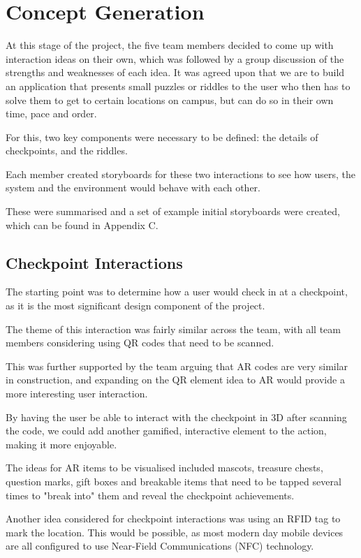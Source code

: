 \documentclass[10pt,twocolumn]{article} %
\begin{document}
\section*{Concept Generation}
At this stage of the project, the five team members decided to come up with interaction ideas on their own, which was followed by a group discussion of the strengths and weaknesses of each idea.
It was agreed upon that we are to build an application that presents small puzzles or riddles to the user who then has to solve them to get to certain locations on campus, but can do so in their own time, pace and order.

For this, two key components were necessary to be defined: the details of checkpoints, and the riddles.

Each member created storyboards for these two interactions to see how users, the system and the environment would behave with each other.

These were summarised and a set of example initial storyboards were created, which can be found in Appendix C.
\subsection*{Checkpoint Interactions}
The starting point was to determine how a user would check in at a checkpoint, as it is the most significant design component of the project. 

The theme of this interaction was fairly similar across the team, with all team members considering using QR codes that need to be scanned. 
 
This was further supported by the team arguing that AR codes are very similar in construction, and expanding on the QR element idea to AR would provide a more interesting user interaction. 

By having the user be able to interact with the checkpoint in 3D after scanning the code, we could add another gamified, interactive element to the action, making it more enjoyable. 

The ideas for AR items to be visualised included mascots, treasure chests, question marks, gift boxes and breakable items that need to be tapped several times to "break into" them and reveal the checkpoint achievements.

Another idea considered for checkpoint interactions was using an RFID tag to mark the location. This would be possible, as most modern day mobile devices are all configured to use Near-Field Communications (NFC) technology. 
\end{document}
